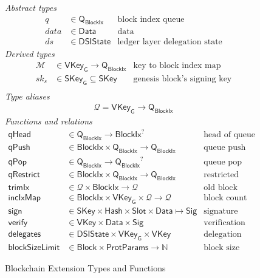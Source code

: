 \documentclass[11pt,a4paper]{article}
\newcommand{\fun}[1]{\mathsf{#1}}
\newcommand{\type}[1]{\mathsf{#1}}
\newcommand{\Hash}{\type{Hash}}  %
\newcommand{\Slot}{\type{Slot}}
\newcommand{\BlockIx}{\type{BlockIx}}
\newcommand{\Block}{\type{Block}}
\newcommand{\Queue}{\type{Q}}
\newcommand{\SKey}{\type{SKey}}
\newcommand{\SKeyGen}{\type{SKey_G}}
\newcommand{\VKey}{\type{VKey}}
\newcommand{\VKeyGen}{\type{VKey_G}}
\newcommand{\Sig}{\type{Sig}}
\newcommand{\Data}{\type{Data}}
\newcommand{\DelegState}{\type{DSIState}}
\newcommand{\ProtParams}{\type{ProtParams}} %
\newcommand{\signname}{sign}
\newcommand{\verifyname}{verify}
\newcommand{\delegationname}{delegates} %
\newcommand{\signmapname}{\mathcal{M}}
\newcommand{\trimixname}{trimIx}
\newcommand{\incixmapname}{incIxMap}
\newcommand{\blocksizelimitname}{blockSizeLimit}
\newcommand{\qrestrname}{qRestrict}
\newcommand{\qpopname}{qPop}
\newcommand{\qheadname}{qHead}
\newcommand{\qpushname}{qPush}
\newcommand{\totalf}{\to}
\newcommand{\partialf}{\mapsto}
\newcommand{\mapqueue}{\mathcal{Q}}
\begin{document}
\begin{figure}
  \emph{Abstract types}
  \begin{align*}
    q  & \in \Queue_\BlockIx  & \text{block index queue}\\
  data & \in \Data    & \text{data}\\
    ds & \in \DelegState & \text{ledger layer delegation state}
  \end{align*}
  \emph{Derived types}
  \begin{align*}
    \signmapname & \in \VKeyGen \totalf \Queue_\BlockIx & \text{key to block index map}\\
    sk_s & \in \SKeyGen \subseteq \SKey & \text{genesis block's signing key}\\
  \end{align*}
  \emph{Type aliases}
  \begin{align*}
    \mapqueue = \VKeyGen \totalf \Queue_\BlockIx
  \end{align*}
  \emph{Functions and relations}
  \begin{align*}
    \fun{\qheadname} & \in \Queue_\BlockIx \totalf \BlockIx^? & \text{head of queue function} \\
    \fun{\qpushname} & \in \BlockIx \times \Queue_\BlockIx \totalf \Queue_\BlockIx
      & \text{queue push function} \\
    \fun{\qpopname} & \in \Queue_\BlockIx \totalf {\Queue_\BlockIx}^?
      & \text{queue pop function} \\
    \fun{\qrestrname} & \in \BlockIx \times \Queue_\BlockIx \totalf \Queue_\BlockIx
      & \text{restricted queue pop function} \\
    \fun{\trimixname} & \in \mapqueue \times \BlockIx \totalf \mapqueue
      & \text{old block removal function} \\
    \fun{\incixmapname} & \in \BlockIx \times \VKeyGen \times \mapqueue \totalf \mapqueue
      & \text{block count increment function}\\
    \fun{\signname} & \in \SKey \times \Hash \times \Slot \times \Data \partialf \Sig
      & \text{signature function}\\
    \fun{\verifyname} & \in \VKey \times \Data \times \Sig
      & \text{verification relation}\\
    \fun{\delegationname} & \in \DelegState \times \VKeyGen \times \VKey
      & \text{delegation relation}\\
    \fun{\blocksizelimitname} & \in \Block \times \ProtParams \totalf \mathbb{N}
      & \text{block size limit in bytes function}
  \end{align*}
  \caption{Blockchain Extension Types and Functions}
  \label{fig:block-ext-types-funs}
\end{figure}
\end{document}
